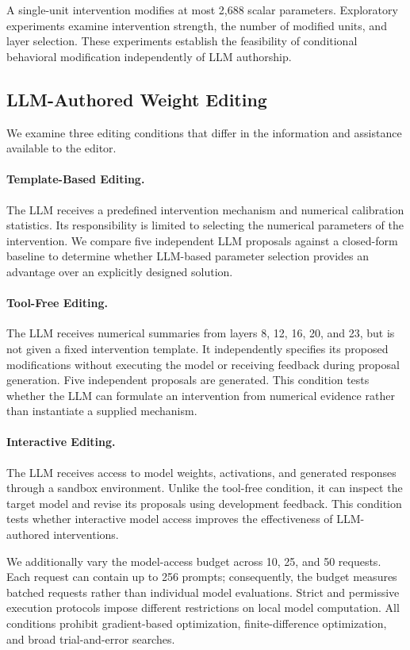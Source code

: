 \documentclass{article}
\begin{document}
A single-unit intervention modifies at most 2,688 scalar parameters. Exploratory experiments examine intervention strength, the number of modified units, and layer selection. These experiments establish the feasibility of conditional behavioral modification independently of LLM authorship.

\subsection{LLM-Authored Weight Editing}

We examine three editing conditions that differ in the information and assistance available to the editor.

\paragraph{Template-Based Editing.}
The LLM receives a predefined intervention mechanism and numerical calibration statistics. Its responsibility is limited to selecting the numerical parameters of the intervention. We compare five independent LLM proposals against a closed-form baseline to determine whether LLM-based parameter selection provides an advantage over an explicitly designed solution.

\paragraph{Tool-Free Editing.}
The LLM receives numerical summaries from layers 8, 12, 16, 20, and 23, but is not given a fixed intervention template. It independently specifies its proposed modifications without executing the model or receiving feedback during proposal generation. Five independent proposals are generated. This condition tests whether the LLM can formulate an intervention from numerical evidence rather than instantiate a supplied mechanism.

\paragraph{Interactive Editing.}
The LLM receives access to model weights, activations, and generated responses through a sandbox environment. Unlike the tool-free condition, it can inspect the target model and revise its proposals using development feedback. This condition tests whether interactive model access improves the effectiveness of LLM-authored interventions.

We additionally vary the model-access budget across 10, 25, and 50 requests. Each request can contain up to 256 prompts; consequently, the budget measures batched requests rather than individual model evaluations. Strict and permissive execution protocols impose different restrictions on local model computation. All conditions prohibit gradient-based optimization, finite-difference optimization, and broad trial-and-error searches.
\end{document}
